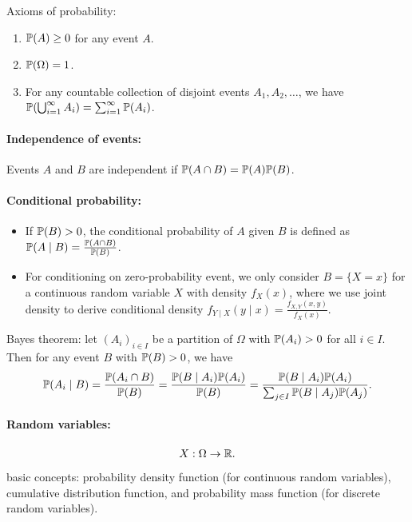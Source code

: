 \documentclass[11pt,letterpaper]{article}
\begin{document}
Axioms of probability:
\begin{enumerate}
  \item ${\mathbb{P}}(A) \ge 0$ for any event $A$.
  \item ${\mathbb{P}}(\Omega) = 1$.
  \item For any countable collection of disjoint events $A_1, A_2, \ldots$, we have ${\mathbb{P}}(\bigcup_{i=1}^{\infty} A_i) = \sum_{i=1}^{\infty} {\mathbb{P}}(A_i)$.
\end{enumerate}

\paragraph{Independence of events:} Events $A$ and $B$ are independent if ${\mathbb{P}}(A \cap B) = {\mathbb{P}}(A){\mathbb{P}}(B)$.

\paragraph{Conditional probability:}
\begin{itemize}
  \item If ${\mathbb{P}}(B) > 0$, the conditional probability of $A$ given $B$ is defined as ${\mathbb{P}}(A \mid B) = \frac{{\mathbb{P}}(A \cap B)}{{\mathbb{P}}(B)}$.
  \item For conditioning on zero-probability event, we only consider $B = \{X = x\}$ for a continuous random variable $X$ with density $f_X(x)$, where we use joint density to derive conditional density $f_{Y \mid X}(y \mid x) = \frac{f_{X,Y}(x,y)}{f_X(x)}$.
\end{itemize}

Bayes theorem: let $(A_i)_{i \in I}$ be a partition of $\Omega$ with ${\mathbb{P}}(A_i) > 0$ for all $i \in I$. Then for any event $B$ with ${\mathbb{P}}(B) > 0$, we have
\begin{align*}
  {\mathbb{P}} (A_i \mid B) = \frac{{\mathbb{P}}( A_i \cap B)}{{\mathbb{P}} (B)} = \frac{{\mathbb{P}} (B \mid A_i) {\mathbb{P}} (A_i)}{{\mathbb{P}} (B)}= \frac{{\mathbb{P}}(B \mid A_i){\mathbb{P}}(A_i)}{\sum_{j \in I} {\mathbb{P}}(B \mid A_j){\mathbb{P}}(A_j)}.
\end{align*}

\paragraph{Random variables:}
\begin{align*}
  X : \Omega \to \mathbb{R}.
\end{align*}
basic concepts: probability density function (for continuous random variables), cumulative distribution function, and probability mass function (for discrete random variables).
\end{document}
